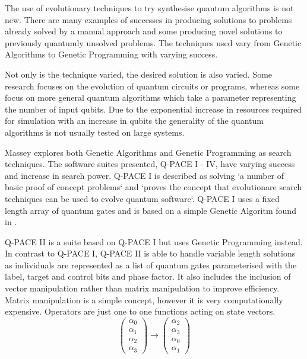 \documentclass[authoryearcitations]{UoYCSproject}
\begin{document}
The use of evolutionary techniques to try synthesise quantum algorithms is not new.
There are many examples of successes in producing solutions to problems already solved by a manual approach and some producing novel solutions to previously quantumly unsolved problems.
The techniques used vary from Genetic Algorithms to Genetic Programming with varying success.

Not only is the technique varied, the desired solution is also varied.
Some research focuses on the evolution of quantum circuits or programs, whereas some focus on more general quantum algorithms which take a parameter representing the number of input qubits.
Due to the exponential increase in resources required for simulation with an increase in qubits the generality of the quantum algorithms is not usually tested on large systems.

Massey\cite{masseythesis,masseymeng} explores both Genetic Algorithms and Genetic Programming as search techniques.
The software suites presented, Q-PACE I - IV, have varying success and increase in search power.
Q-PACE I\cite{masseymeng} is described as solving `a number of basic proof of concept problems`\cite{masseythesis} and `proves the concept that evolutionare search techniques can be used to evolve quantum software`\cite{masseythesis}.
Q-PACE I uses a fixed length array of quantum gates and is based on a simple Genetic Algoritm found in \cite{1989goldberg}.

Q-PACE II\cite{masseythesis} is a suite based on Q-PACE I but uses Genetic Programming instead.
In contrast to Q-PACE I, Q-PACE II is able to handle variable length solutions as individuals are represented as a list of quantum gates parameterised with the label, target and control bits and phase factor.
It also includes the inclusion of vector manipulation rather than matrix manipulation to improve efficiency.
Matrix manipulation is a simple concept, however it is very computationally expensive.
Operators are just one to one functions acting on state vectors.
\begin{equation}
 \begin{pmatrix}
\alpha_0\\
\alpha_1\\
\alpha_2\\
\alpha_3
\end{pmatrix}
\rightarrow
 \begin{pmatrix}
\alpha_2\\
\alpha_3\\
\alpha_0\\
\alpha_1
\end{pmatrix}
\label{vectormanipulation}
\end{equation}
\end{document}
